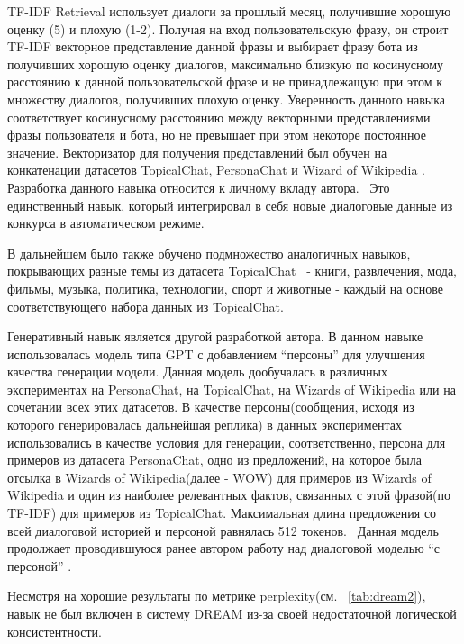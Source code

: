 TF-IDF Retrieval использует диалоги за прошлый месяц, получившие хорошую оценку (5) и плохую (1-2). Получая на вход пользовательскую фразу, он строит TF-IDF векторное представление данной фразы и выбирает фразу бота из получивших хорошую оценку диалогов, максимально близкую по косинусному расстоянию к данной пользовательской фразе и не принадлежащую при этом к множеству диалогов, получивших плохую оценку. Уверенность данного навыка соответствует косинусному расстоянию между векторными представлениями фразы пользователя и бота, но не превышает при этом некоторе постоянное значение. Векторизатор для получения представлений был обучен на конкатенации датасетов TopicalChat\cite{topicalchat}, PersonaChat \cite{personachat} и Wizard of Wikipedia \cite{wow}. Разработка данного навыка относится к личному вкладу автора.  Это единственный навык, который интегрировал в себя новые диалоговые данные из конкурса в автоматическом режиме.

В дальнейшем было также обучено подмножество аналогичных навыков, покрывающих разные темы из датасета TopicalChat  - книги, развлечения, мода, фильмы, музыка, политика, технологии, спорт и животные - каждый на основе соответствующего набора данных из TopicalChat. 


Генеративный навык является другой разработкой автора. В данном навыке использовалась модель типа GPT\cite{radford_2018_gpt} с добавлением “персоны” для улучшения качества генерации модели. Данная модель дообучалась в различных экспериментах на PersonaChat, на TopicalChat, на Wizards of Wikipedia или на сочетании всех этих датасетов. В качестве персоны(сообщения, исходя из которого генерировалась дальнейшая реплика) в данных экспериментах использовались в качестве условия для генерации, соответственно, персона для примеров из датасета PersonaChat, одно из предложений, на которое была отсылка в Wizards of Wikipedia(далее - WOW) для примеров из Wizards of Wikipedia и один из наиболее релевантных фактов, связанных с этой фразой(по TF-IDF) для примеров из TopicalChat. Максимальная длина предложения со всей диалоговой историей и персоной равнялась 512 токенов.  Данная модель продолжает проводившуюся ранее автором работу над диалоговой моделью “с персоной” \cite{Болотин_Карпов_Рашков_Шкурак_2019}.

Несмотря на хорошие результаты по метрике perplexity(см. ~\ref{tab:dream2}), навык не был включен в систему DREAM из-за своей недостаточной логической консистентности.


